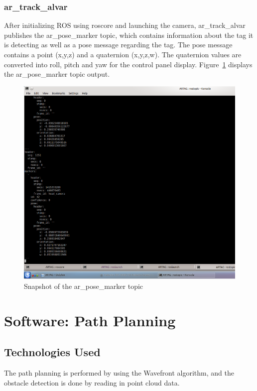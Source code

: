 \subsubsection{ar\_track\_alvar}


After initializing ROS using roscore and launching the camera, ar\_track\_alvar publishes the ar\_pose\_marker topic, which contains information about the tag it is detecting as well as a pose message regarding the tag. The pose message contains a point (x,y,z) and a quaternion (x,y,z,w). The quaternion values are converted into roll, pitch and yaw for the control panel display. Figure~\ref{arposemarker} displays the ar\_pose\_marker topic output.


\begin{figure}[tbh]
\begin{center}
\includegraphics[width=1\textwidth]{resources/img/ar_pose_marker}
\end{center}
\caption{Snapshot of the ar\_pose\_marker topic
\label{arposemarker}}
\end{figure}



\section{Software: Path Planning }\label{softwarepathplanning}

\subsection{Technologies  Used}
The path planning is performed by using the Wavefront algorithm, and the obstacle detection is done by reading in point cloud data.

